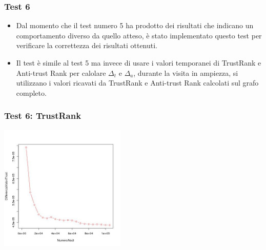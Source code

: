 \documentclass{beamer}
\begin{document}
\begin{frame}
\frametitle{Test 6}
\begin{itemize}
 \item Dal momento che il test numero 5 ha prodotto dei risultati che indicano un comportamento diverso da quello atteso, è stato implementato questo test per verificare la correttezza dei risultati ottenuti.
 \item Il test è simile al test 5 ma invece di usare i valori temporanei di TrustRank e Anti-trust Rank per calolare \(\Delta_t\) e \(\Delta_a\), durante la visita in ampiezza, si utilizzano i valori ricavati da TrustRank e Anti-trust Rank calcolati sul grafo completo.
 \end{itemize}
\end{frame}
\begin{frame}
\frametitle{Test 6: TrustRank}
\begin{center}
 \includegraphics[height=6cm]{immagini/test6/averageCompleteTest_trust_62}
\end{center}
\end{frame}
\end{document}
